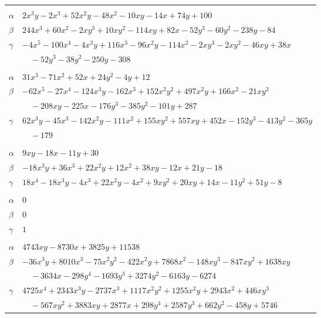 \documentclass[11pt]{article}
\begin{document}
\begin{longtable}{@{}ll@{}}
\addlinespace[3pt]
\multicolumn{2}{@{}l}{$\{i,j\}=\{5,162\}$, $k_{ij}=2^{3}\cdot 3^{3}$}\\
$\alpha$ & $2x^{3}y-2x^{3}+52x^{2}y-48x^{2}-10xy-14x+74y+100$\\
$\beta$ & $244x^{3}+60x^{2}-2xy^{3}+10xy^{2}-114xy+82x-52y^{3}-60y^{2}-238y-84$\\
$\gamma$ & $-4x^{5}-100x^{4}-4x^{3}y+116x^{3}-96x^{2}y-114x^{2}-2xy^{3}-2xy^{2}-46xy+38x$\\
 & $\quad -52y^{3}-38y^{2}-250y-308$\\
\addlinespace[3pt]
\multicolumn{2}{@{}l}{$\{i,j\}=\{5,171\}$, $k_{ij}=2^{4}\cdot 3^{2}$}\\
$\alpha$ & $31x^{3}-71x^{2}+52x+24y^{2}-4y+12$\\
$\beta$ & $-62x^{5}-27x^{4}-124x^{3}y-162x^{3}+152x^{2}y^{2}+497x^{2}y+166x^{2}-21xy^{2}$\\
 & $\quad -208xy-225x-176y^{3}-385y^{2}-101y+287$\\
$\gamma$ & $62x^{3}y-45x^{3}-142x^{2}y-111x^{2}+155xy^{2}+557xy+452x-152y^{3}-413y^{2}-365y$\\
 & $\quad -179$\\
\addlinespace[3pt]
\multicolumn{2}{@{}l}{$\{i,j\}=\{5,174\}$, $k_{ij}=2^{3}\cdot 3^{2}$}\\
$\alpha$ & $9xy-18x-11y+30$\\
$\beta$ & $-18x^{3}y+36x^{3}+22x^{2}y+12x^{2}+38xy-12x+21y-18$\\
$\gamma$ & $18x^{4}-18x^{3}y-4x^{3}+22x^{2}y-4x^{2}+9xy^{2}+20xy+14x-11y^{2}+51y-8$\\
\addlinespace[3pt]
\multicolumn{2}{@{}l}{$\{i,j\}=\{5,176\}$, $k_{ij}=2$}\\
$\alpha$ & $0$\\
$\beta$ & $0$\\
$\gamma$ & $1$\\
\addlinespace[3pt]
\multicolumn{2}{@{}l}{$\{i,j\}=\{5,183\}$, $k_{ij}=2^{4}\cdot 3^{4}\cdot 13$}\\
$\alpha$ & $4743xy-8730x+3825y+11538$\\
$\beta$ & $-36x^{3}y+8010x^{3}-75x^{2}y^{2}-422x^{2}y+7868x^{2}-148xy^{3}-847xy^{2}+1638xy$\\
 & $\quad -3634x-298y^{4}-1693y^{3}+3274y^{2}-6163y-6274$\\
$\gamma$ & $4725x^{4}+2343x^{3}y-2737x^{3}+1117x^{2}y^{2}+1255x^{2}y+2943x^{2}+446xy^{3}$\\
 & $\quad -567xy^{2}+3883xy+2877x+298y^{4}+2587y^{3}+662y^{2}-458y+5746$\\

\end{longtable}
\end{document}
